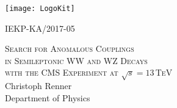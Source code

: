 \begin{titlepage}
  \begin{addmargin}[0cm]{0cm}
    \thispagestyle{empty}
    \vspace{-1cm}
    \begin{center}

	\end{center}
	
  		\begin{minipage}{0.5\textwidth}
  			\texttt{[image: LogoKit]}
  		\end{minipage}%
  		\begin{minipage}{0.5\textwidth}
  			\hspace{3.5cm}IEKP-KA/2017-05
  		\end{minipage}
  		
	
	\vspace{2cm}
	\begin{center}

	\vspace{0.8cm}

	\Large{\textsc{Search for Anomalous Couplings\\in Semileptonic WW and WZ Decays\\with the CMS Experiment at $\sqrt{s}=13$\,TeV}}\\
	\vspace{0.9cm}
	\Large{Christoph Renner}\\
	\vspace{0.9cm}
	\vspace{1cm}
	\large{Department of Physics\\
  
}
\end{center}
\end{addmargin}
\end{titlepage}
